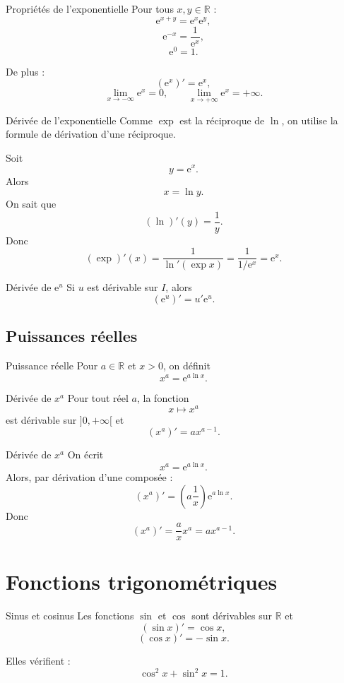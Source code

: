 \documentclass[11pt,a4paper]{article}
\newcommand{\R}{\mathbb{R}}
\newcommand{\e}{\mathrm{e}}
\begin{document}
\begin{theorembox}{Propriétés de l'exponentielle}
Pour tous $x,y\in\R$ :
\[
\e^{x+y}=\e^x\e^y,
\]
\[
\e^{-x}=\frac1{\e^x},
\]
\[
\e^0=1.
\]

De plus :
\[
(\e^x)'=\e^x,
\]
\[
\lim_{x\to-\infty}\e^x=0,
\qquad
\lim_{x\to+\infty}\e^x=+\infty.
\]
\end{theorembox}

\begin{proofbox}{Dérivée de l'exponentielle}
Comme $\exp$ est la réciproque de $\ln$, on utilise la formule de dérivation d'une réciproque.

Soit
\[
y=\e^x.
\]
Alors
\[
x=\ln y.
\]
On sait que
\[
(\ln)'(y)=\frac1y.
\]
Donc
\[
(\exp)'(x)
=
\frac1{\ln'(\exp x)}
=
\frac1{1/\e^x}
=
\e^x.
\]
\end{proofbox}

\begin{theorembox}{Dérivée de $\e^u$}
Si $u$ est dérivable sur $I$, alors
\[
(\e^u)'=u'\e^u.
\]
\end{theorembox}

\subsection{Puissances réelles}

\begin{definitionbox}{Puissance réelle}
Pour $a\in\R$ et $x>0$, on définit
\[
x^a=\e^{a\ln x}.
\]
\end{definitionbox}

\begin{theorembox}{Dérivée de $x^a$}
Pour tout réel $a$, la fonction
\[
x\mapsto x^a
\]
est dérivable sur $]0,+\infty[$ et
\[
(x^a)'=ax^{a-1}.
\]
\end{theorembox}

\begin{proofbox}{Dérivée de $x^a$}
On écrit
\[
x^a=\e^{a\ln x}.
\]
Alors, par dérivation d'une composée :
\[
(x^a)'=
\left(a\frac1x\right)\e^{a\ln x}.
\]
Donc
\[
(x^a)'=\frac ax x^a=ax^{a-1}.
\]
\end{proofbox}

\section{Fonctions trigonométriques}

\begin{theorembox}{Sinus et cosinus}
Les fonctions $\sin$ et $\cos$ sont dérivables sur $\R$ et
\[
(\sin x)'=\cos x,
\]
\[
(\cos x)'=-\sin x.
\]

Elles vérifient :
\[
\cos^2 x+\sin^2 x=1.
\]
\end{theorembox}
\end{document}
